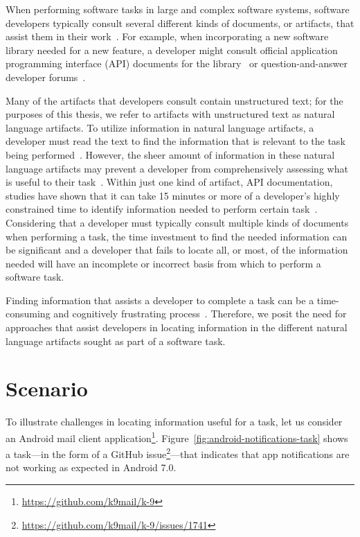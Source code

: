 

When performing software tasks in large and complex software systems, software developers typically consult several different kinds of documents, or artifacts, that assist them in their work~\cite{Starke2009, Meyer2017}. For example, 
when incorporating a new software library needed for a new feature, a developer might consult official application programming interface (API) documents for the library~\cite{robillard2011field, umarji2008archetypal} or 
 question-and-answer developer forums~\cite{parnin2012, silva2019}.



Many of the artifacts that developers consult
contain unstructured text; for the purposes of this thesis, we refer to artifacts with unstructured text as natural language artifacts.  
To utilize information in  natural language artifacts, a developer must read the text to find the information that is relevant to the task being performed~\cite{Bavota2016}.
However, 
the sheer amount of information in these natural language artifacts may prevent a developer from comprehensively assessing what is useful to their task~\cite{Murphy2005}.
Within just one kind of artifact, API
documentation, studies have shown that it can take 15 minutes or more
of a developer's highly constrained time to identify 
information needed to perform certain task~\cite{endrikat2014, Meyer2017}. 
Considering that a developer must typically
consult multiple kinds of documents
when performing a task, the time investment to find the needed information can be significant
and a developer that fails to locate all, or most, of the information needed
will have an incomplete or incorrect basis from which to perform a software task.



Finding information that assists a developer to complete a task can be a time-consuming
 and cognitively frustrating process~\cite{Begel2008,
 robillard2011field}. Therefore, we posit the need for approaches that assist developers in locating information in the different natural language artifacts sought  as part of a software task.

 
 



 \section{Scenario}
 \label{cp1:example}
 
 
 
 To illustrate challenges in locating information useful for a task, let us consider an  Android mail client application\footnote{\url{https://github.com/k9mail/k-9}}.
 Figure~\ref{fig:android-notifications-task} shows a task---in the form of a GitHub issue\footnote{\url{https://github.com/k9mail/k-9/issues/1741}}---that indicates that 
 app notifications 
 are not working as expected in Android 7.0. 
 
